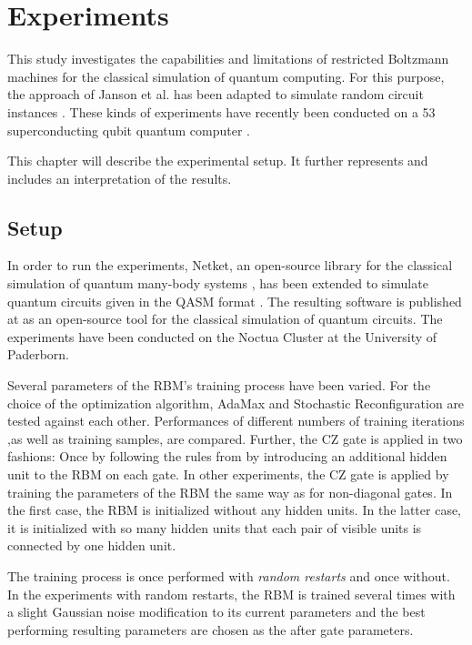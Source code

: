 \chapter{Experiments}

This study investigates the capabilities and limitations of restricted Boltzmann machines
for the classical simulation of quantum computing. For this purpose, the approach of Janson 
et al. \cite{jnsson2018neuralnetwork} has been adapted to simulate random circuit instances \cite{Boixo2018supremacy}.
These kinds of experiments have recently been conducted on a 53 superconducting qubit quantum computer \cite{martines2019supremacy}.

This chapter will describe the experimental setup. It further represents and includes an
interpretation of the results.

\section{Setup}

In order to run the experiments, Netket, an open-source library for the classical simulation of quantum 
many-body systems \cite{netket2019}, has been extended to simulate quantum circuits given in the QASM format \cite{cross2017open}. The resulting 
software is published at \cite{} as an open-source tool for the classical simulation 
of quantum circuits. The experiments have been conducted on the Noctua Cluster at the University of Paderborn.

Several parameters of the RBM's training process have been varied. For the choice of the optimization algorithm, AdaMax and 
Stochastic Reconfiguration are tested against each other. Performances of different numbers of training iterations 
,as well as training samples, are compared. Further, the CZ gate is applied in two fashions: Once 
by following the rules from \cite{} by introducing an additional hidden unit to the RBM on each gate. In other 
experiments, the CZ gate is applied by training the parameters of the RBM the same way as for 
non-diagonal gates. In the first case, the RBM is initialized without any hidden units. In the latter 
case, it is initialized with so many hidden units that each pair of visible units is connected 
by one hidden unit. 

The training process is once performed with \textit{random restarts} and once without. 
In the experiments with random restarts, the RBM is trained several times with a slight Gaussian noise modification to its 
current parameters and the best performing resulting parameters are chosen as the after gate parameters. 

